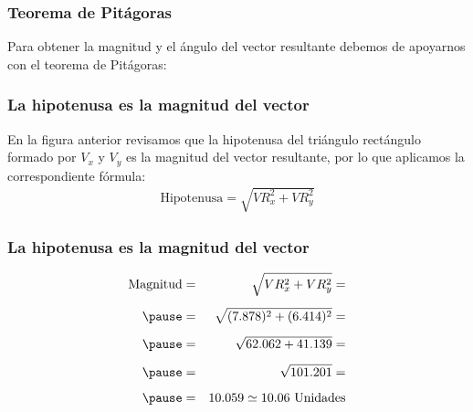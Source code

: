 \documentclass[14pt, xcolor={usenames,dvipsnames}]{beamer}
\begin{document}
\begin{frame}
\frametitle{Teorema de Pitágoras}
Para obtener la magnitud y el ángulo del vector resultante debemos de apoyarnos con el teorema de Pitágoras:
\begin{figure}
\centering
{}
\end{figure}
\end{frame}
\begin{frame}
\frametitle{La hipotenusa es la magnitud del vector}
En la figura anterior revisamos que la hipotenusa del triángulo rectángulo formado por $V_{x}$ y $V_{y}$ es la magnitud del vector resultante, por lo que aplicamos la correspondiente fórmula:
\begin{align*}
\text{Hipotenusa} =  \sqrt{VR_{x}^{2} + VR_{y}^{2}}
\end{align*}
\end{frame}
\begin{frame}
\frametitle{La hipotenusa es la magnitud del vector}
\begin{eqnarray*}
\text{Magnitud} &=& \sqrt{VR_{x}^{2} + VR_{y}^{2}} = \\[0.5em] \pause
&=& \sqrt{(7.878)^{2} + (6.414)^{2}} = \\[0.5em] \pause
&=& \sqrt{62.062 + 41.139} = \\[0.5em] \pause
&=& \sqrt{101.201} = \\[0.5em] \pause
&=& 10.059 \simeq 10.06 \text{  Unidades}
\end{eqnarray*}
\end{frame}
\end{document}
